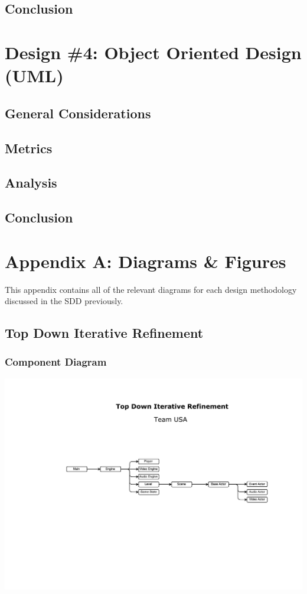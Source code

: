 \documentclass{article}
\begin{document}
	\subsection{Conclusion}
%
%
\section{Design \#4: Object Oriented Design (UML)}
	\subsection{General Considerations}
	\subsection{Metrics}
	\subsection{Analysis}
	\subsection{Conclusion}
%
%
\section{Appendix A: Diagrams \& Figures}
	This appendix contains all of the relevant diagrams for each design methodology discussed in the SDD previously.
	\subsection{Top Down Iterative Refinement}
		\subsubsection{Component Diagram}
			\begin{center}
				\includegraphics[scale=0.5]{Top_down}
			\end{center}
\end{document}
